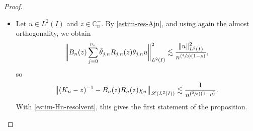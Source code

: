 \documentclass[JEP,XML,SOM,Unicode]{cedram}
\let\mathcal\mathscr
\newcommand{\Psfrac}[2]{(\sfrac{#1}{#2})}
\newcommand{\psfrac}[2]{\sfrac{(#1)}{#2}}
\theoremstyle{plain}
\theoremstyle{definition}
\newcommand {\limt}[2]{\xrightarrow[#1 \to #2]{}}
\newcommand{\abs}[1]{\vert #1\vert}
\newcommand{\nr}[1]{\Vert #1\Vert}
\newcommand{\bnr}[1]{\bigl\Vert #1\bigr\Vert}
\newcommand{\bbnr}[1]{\biggl\Vert #1\biggr\Vert}
\newcommand{\Ii}[2] {\left\{ #1,\dots,#2 \right\}}
\newcommand{\inv}{^{-1}}
\newcommand{\1}{\mathds 1}
\newcommand{\Dom}{\mathsf{Dom}}
\newcommand{\R}{\mathbb{R}}
\def\C{\mathbb{C}}
\newcommand{\N}{\mathbb{N}}
\let\d\delta
\let\th\theta
\let\h\chi
\newcommand{\Lc}{{\mathcal L}}
\begin{document}
\begin{proof}
\begin{itemize}
Let $\tilde \th \in C_0^\infty(\R,[0,1])$ be equal to 1 on $\big[-\sfrac 23,\sfrac 23\big]$ and supported in $]-1,1[$. Then for $n \in \N^*$, $j \in \Ii 1 {\nu_n}$ and $y \in \bar I$ we set
\[
\tilde \th_{j,n}(y) = \tilde \th \bigl(\psfrac {y-a_{j,n}}{\d_n} \bigr),
\]
and then
\begin{equation} \label{eq_def_Qn}
Q_n(z) = R_n(z) \h_n + \sum_{j=0}^{\nu_n} \tilde \theta_{j,n} R_{j,n}(z) \theta_{j,n}.
\end{equation}
For $u \in \Dom(K_n)$ and $z \in \C_n^-$ we have $\th_{j,n} u = \th_{j,n} \tilde \th_{j,n} u$ and
\[
\theta_{j,n} (K_n-z) (1- \tilde \theta_{j,n}) u = 0,
\]
so
\[
\nr{Q_n(z) (K_n-z) u - u }_{L^2(I)} \leq \nr{T_n(z) u}_{L^2(I)} + \bbnr{\sum_{j=0}^{\nu_n} \tilde \th_{j,n} T_{j,n}(z) \tilde \th_{j,n} u}_{L^2(I)}.
\]
Moreover $\tilde \th_{j,n} \tilde \th_{k,n} = 0$ whenever $\abs{j-k} \geq 2$, so by almost orthogonaly (twice) we can write
\begin{align*}
\bbnr{\sum_{j=0}^{\nu_n} \tilde \th_{j,n} T_{j,n}(z) \tilde \th_{j,n} u}^2_{L^2(I)}
& \lesssim \sum_{j=0}^{\nu_n} \nr{\tilde \th_{j,n} T_{j,n}(z) \tilde \th_{j,n} u}^2_{L^2(I)}\\
& \lesssim \sup_{0\leq j \leq \nu_n} \nr{T_{j,n}(z)}_{\Lc(L^2(I))}^2 \sum_{j=0}^{\nu_n} \nr{\tilde \th_{j,n} u}^2_{L^2(I)}\\
& \lesssim \sup_{0\leq j \leq \nu_n} \nr{T_{j,n}(z)}_{\Lc(L^2(I))}^2\, \nr{u}^2_{L^2(I)}.
\end{align*}
This proves
\begin{equation} \label{eq-Qn-Kn-z}
\sup_{z \in \C_n^-} \sup_{\substack{u \in \Dom(K_n)\\ \nr{u}_{L^2(I)} = 1}} \nr{Q_n(z) (K_n-z) u - u}_{L^2(I)} \limt n {+\infty} 0.
\end{equation}
Thus for $n$ large enough the operator $K_n$ has no eigenvalue and hence no spectrum in $\C_n^-$. Moreover for $z \in \C_n^-$ we have
\begin{equation} \label{eq-Qngoodapprox}
(K_n-z)\inv = B_n(z) Q_n(z),
\end{equation}
where
\[
B_n(z) = \bigl(1 + \bigl(Q_n(z) (K_n-z) - 1 \bigr) \bigr)\inv
\]
is bounded on $L^2(I)$ uniformly in $z \in \C_n^-$ and $n$ large enough.

\item
Let $u \in L^2(I)$ and $z \in \mathbb{C}_n^-$. By \eqref{estim-res-Ajn}, and using again the almost orthogonality, we obtain
\[
\bbnr{B_n(z) \sum_{j=0}^{\nu_n} \tilde \theta_{j,n} R_{j,n}(z) \theta_{j,n} u}^2_{L^2(I)} \lesssim \frac {\nr{u}^2_{L^2(I)}}{n ^{\Psfrac 43(1-\rho)}},
\]
so
\begin{equation} \label{eq-res-Kn-Rn}
\bnr{(K_n-z)\inv - B_n(z) R_n(z) \h_n }_{\Lc(L^2(I))} \lesssim \frac 1 {n^{\Psfrac 23(1-\rho)}}.
\end{equation}
With \eqref{estim-Hn-resolvent}, this gives the first statement of the proposition.


\end{itemize}
\end{proof}
\end{document}
